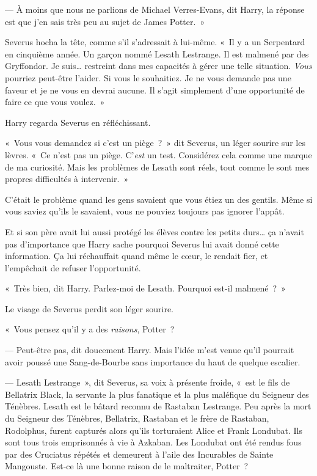 --- À moins que nous ne parlions de Michael Verres-Evans, dit Harry, la réponse est que j'en sais très peu au sujet de James Potter.~»

Severus hocha la tête, comme s'il s'adressait à lui-même. «~Il y a un Serpentard en cinquième année. Un garçon nommé Lesath Lestrange. Il est malmené par des Gryffondor. Je suis… restreint dans mes capacités à gérer une telle situation. \emph{Vous} pourriez peut-être l'aider. Si vous le souhaitiez. Je ne vous demande pas une faveur et je ne vous en devrai aucune. Il s'agit simplement d'une opportunité de faire ce que vous voulez.~»

Harry regarda Severus en réfléchissant.

«~Vous vous demandez si c'est un piège~?~» dit Severus, un léger sourire sur les lèvres. «~Ce n'est pas un piège. C'\emph{est} un test. Considérez cela comme une marque de ma curiosité. Mais les problèmes de Lesath sont réels, tout comme le sont mes propres difficultés à intervenir.~»

C'était le problème quand les gens savaient que vous étiez un des gentils. Même si vous saviez qu'ils le savaient, vous ne pouviez toujours pas ignorer l'appât.

Et si son père avait lui aussi protégé les élèves contre les petits durs… ça n'avait pas d'importance que Harry sache pourquoi Severus lui avait donné cette information. Ça lui réchauffait quand même le cœur, le rendait fier, et l'empêchait de refuser l'opportunité.

«~Très bien, dit Harry. Parlez-moi de Lesath. Pourquoi est-il malmené~?~»

Le visage de Severus perdit son léger sourire.

«~Vous pensez qu'il y a des \emph{raisons}, Potter~?

--- Peut-être pas, dit doucement Harry. Mais l'idée m'est venue qu'il pourrait avoir poussé une Sang-de-Bourbe sans importance du haut de quelque escalier.

--- Lesath Lestrange~», dit Severus, sa voix à présente froide, «~est le fils de Bellatrix Black, la servante la plus fanatique et la plus maléfique du Seigneur des Ténèbres. Lesath est le bâtard reconnu de Rastaban Lestrange. Peu après la mort du Seigneur des Ténèbres, Bellatrix, Rastaban et le frère de Rastaban, Rodolphus, furent capturés alors qu'ils torturaient Alice et Frank Londubat. Ils sont tous trois emprisonnés à vie à Azkaban. Les Londubat ont été rendus fous par des Cruciatus répétés et demeurent à l'aile des Incurables de Sainte Mangouste. Est-ce là une bonne raison de le maltraiter, Potter~?

